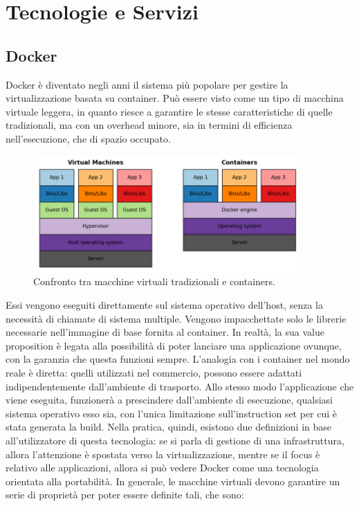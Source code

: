 \chapter{Tecnologie e Servizi}

\section{Docker}

Docker è diventato negli anni il sistema più popolare per gestire la virtualizzazione basata su container. Può essere visto come un tipo di macchina virtuale leggera, in quanto riesce a garantire le stesse caratteristiche di quelle tradizionali, ma con un overhead minore, sia in termini di efficienza nell'esecuzione, che di spazio occupato. 

\begin{figure}[htbp]
    \centering
    \includegraphics[width=0.9\textwidth]{figures/containers-and-vms.png}
    \caption{Confronto tra macchine virtuali tradizionali e containers.} 
    \label{fig:virt-tech}
\end{figure}

Essi vengono eseguiti direttamente sul sistema operativo dell'host, senza la necessità di chiamate di sistema multiple. Vengono impacchettate solo le librerie necessarie nell'immagine di base fornita al container. In realtà, la sua value proposition è legata alla possibilità di poter lanciare una applicazione ovunque, con la garanzia che questa funzioni sempre. L'analogia con i container nel mondo reale è diretta: quelli utilizzati nel commercio, possono essere adattati indipendentemente dall'ambiente di trasporto. Allo stesso modo l'applicazione che viene eseguita, funzionerà a prescindere dall'ambiente di esecuzione, qualsiasi sistema operativo esso sia, con l'unica limitazione sull'instruction set per cui è stata generata la build.  Nella pratica, quindi, esistono due definizioni in base all'utilizzatore di questa tecnologia: se si parla di gestione di una infrastruttura, allora l'attenzione è spostata verso la virtualizzazione, mentre se il focus è relativo alle applicazioni, allora si può vedere Docker come una tecnologia orientata alla portabilità. In generale, le macchine virtuali devono garantire un serie di proprietà per poter essere definite tali, che sono:

